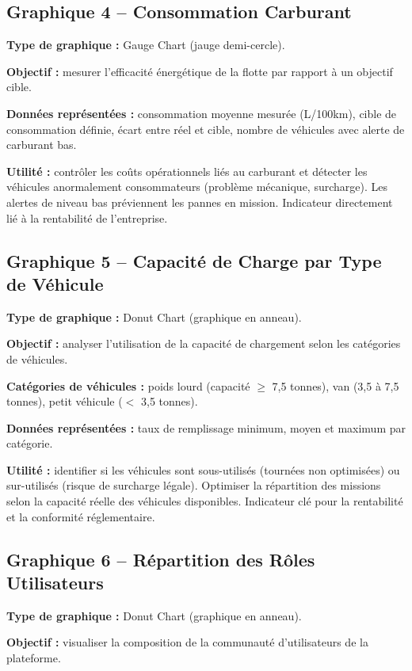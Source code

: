 \documentclass[12pt,a4paper]{report}
\begin{document}
\subsection{Graphique 4 -- Consommation Carburant}

\textbf{Type de graphique :} Gauge Chart (jauge demi-cercle).

\textbf{Objectif :} mesurer l'efficacité énergétique de la flotte par
rapport à un objectif cible.

\textbf{Données représentées :} consommation moyenne mesurée (L/100km),
cible de consommation définie, écart entre réel et cible, nombre de
véhicules avec alerte de carburant bas.

\textbf{Utilité :} contrôler les coûts opérationnels liés au carburant et
détecter les véhicules anormalement consommateurs (problème mécanique,
surcharge). Les alertes de niveau bas préviennent les pannes en mission.
Indicateur directement lié à la rentabilité de l'entreprise.

\subsection{Graphique 5 -- Capacité de Charge par Type de Véhicule}

\textbf{Type de graphique :} Donut Chart (graphique en anneau).

\textbf{Objectif :} analyser l'utilisation de la capacité de chargement
selon les catégories de véhicules.

\textbf{Catégories de véhicules :} poids lourd (capacité $\geq$ 7,5
tonnes), van (3,5 à 7,5 tonnes), petit véhicule ($<$ 3,5 tonnes).

\textbf{Données représentées :} taux de remplissage minimum, moyen et
maximum par catégorie.

\textbf{Utilité :} identifier si les véhicules sont sous-utilisés
(tournées non optimisées) ou sur-utilisés (risque de surcharge légale).
Optimiser la répartition des missions selon la capacité réelle des
véhicules disponibles. Indicateur clé pour la rentabilité et la conformité
réglementaire.

\subsection{Graphique 6 -- Répartition des Rôles Utilisateurs}

\textbf{Type de graphique :} Donut Chart (graphique en anneau).

\textbf{Objectif :} visualiser la composition de la communauté
d'utilisateurs de la plateforme.
\end{document}
